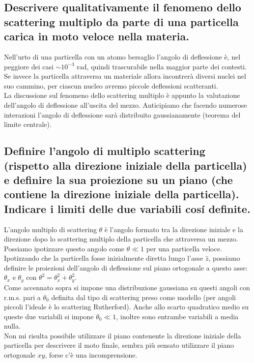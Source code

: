 \subsection[]{Descrivere qualitativamente il fenomeno dello scattering multiplo da parte di una particella carica in moto veloce nella materia.
}\label{sec:4.a.28}
Nell'urto di una particella con un atomo bersaglio l'angolo di deflessione è, nel peggiore dei casi $\sim 10^{-3}$ rad, quindi trascurabile nella maggior parte dei contesti. Se invece la particella attraversa un materiale allora incontrerà diversi nuclei nel suo cammino, per ciascun nucleo avremo piccole deflessioni scatteranti.\\
La discussione sul fenomeno dello scattering multiplo è appunto la valutazione dell'angolo di deflessione all'uscita del mezzo. Anticipiamo che facendo numerose interazioni l'angolo di deflessione sarà distribuito gaussianamente (teorema del limite centrale). 

\subsection[]{Definire l'angolo di multiplo scattering (rispetto alla direzione iniziale della particella) e definire la sua proiezione su un piano (che contiene la direzione iniziale della particella). Indicare i limiti delle due variabili cosí definite.
}\label{sec:4.a.29}
L'angolo multiplo di scattering $\theta$ è l'angolo formato tra la direzione iniziale e la direzione dopo lo scattering multiplo della particella che attraversa un mezzo. Possiamo ipotizzare questo angolo come $\theta \ll 1$ per una particella veloce.\\
Ipotizzando che la particella fosse inizialmente diretta lungo l'asse $\hat{z}$, possiamo definire le proiezioni dell'angolo di deflessione sul piano ortogonale a questo asse: $\theta_{x}$ e $\theta_{y}$ con $\theta^2=\theta^2_{x}+\theta^2_{y}$.\\
Come accennato sopra si impone una distribuzione gaussiana su questi angoli con r.m.s. pari a $\theta_0$ definita dal tipo di scattering preso come modello (per angoli piccoli l'ideale è lo scattering Rutherford).
Anche allo scarto quadratico medio su queste due variabili si impone $\theta_0\ll 1$, inoltre sono entrambe variabili a media nulla.\\
Non mi risulta possibile utilizzare il piano contenente la direzione iniziale della particella per descrivere il moto finale, sembra più sensato utilizzare il piano ortogonale $xy$, forse c'è una incomprensione.
